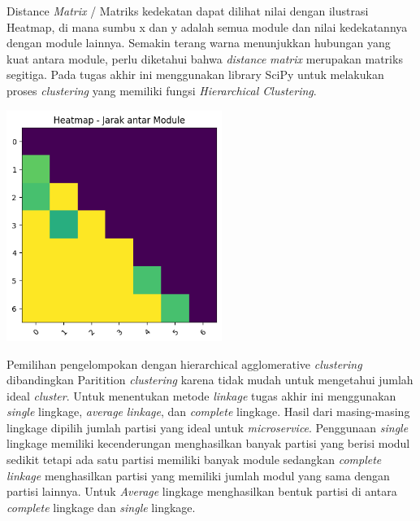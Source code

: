 Distance \textit{Matrix} / Matriks kedekatan dapat dilihat nilai dengan ilustrasi Heatmap, di mana sumbu x dan y adalah semua module dan nilai kedekatannya dengan module lainnya. Semakin terang warna menunjukkan hubungan yang kuat antara module, perlu diketahui bahwa \textit{distance} \textit{matrix} merupakan matriks segitiga. Pada tugas akhir ini menggunakan library SciPy untuk melakukan proses \textit{clustering} yang memiliki fungsi \textit{Hierarchical Clustering}.

\begin{center}
	\includegraphics[width=7cm]{img/bab_3/heatmap.png}
	\label{fig:asd}
\end{center}

Pemilihan pengelompokan dengan hierarchical agglomerative \textit{clustering} dibandingkan Paritition \textit{clustering} karena tidak mudah untuk mengetahui jumlah ideal \textit{cluster}. Untuk menentukan metode \textit{linkage} tugas akhir ini menggunakan \textit{single} lingkage, \textit{average} \textit{linkage}, dan \textit{complete} lingkage. Hasil dari masing-masing lingkage dipilih jumlah partisi yang ideal untuk \textit{microservice}. Penggunaan \textit{single} lingkage memiliki kecenderungan menghasilkan banyak partisi yang berisi modul sedikit tetapi ada satu partisi memiliki banyak module sedangkan \textit{complete} \textit{linkage} menghasilkan partisi yang memiliki jumlah modul yang sama dengan partisi lainnya. Untuk \textit{Average} lingkage menghasilkan bentuk partisi di antara \textit{complete} lingkage dan \textit{single} lingkage.

